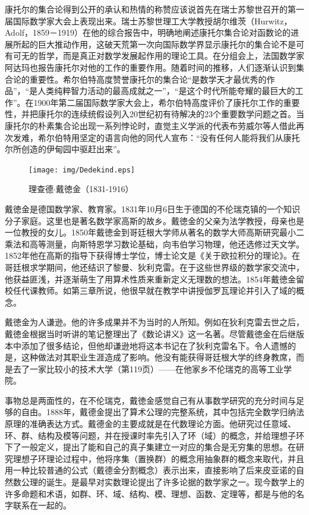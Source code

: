 \documentclass{article}
\begin{document}
康托尔的集合论得到公开的承认和热情的称赞应该说首先在瑞士苏黎世召开的第一届国际数学家大会上表现出来。瑞士苏黎世理工大学教授胡尔维茨（Hurwitz，Adolf，1859－1919）在他的综合报告中，明确地阐述康托尔集合论对函数论的进展所起的巨大推动作用，这破天荒第一次向国际数学界显示康托尔的集合论不是可有可无的哲学，而是真正对数学发展起作用的理论工具。在分组会上，法国数学家阿达玛也报告康托尔对他的工作的重要作用。随着时间的推移，人们逐渐认识到集合论的重要性。希尔伯特高度赞誉康托尔的集合论“是数学天才最优秀的作品”，“是人类纯粹智力活动的最高成就之一”，“是这个时代所能夸耀的最巨大的工作”。在1900年第二届国际数学家大会上，希尔伯特高度评价了康托尔工作的重要性，并把康托尔的连续统假设列入20世纪初有待解决的23个重要数学问题之首。当康托尔的朴素集合论出现一系列悖论时，直觉主义学派的代表布劳威尔等人借此再次发难，希尔伯特用坚定的语言向他的同代人宣布：“没有任何人能将我们从康托尔所创造的伊甸园中驱赶出来”。

\begin{figure}
 \centering
 \texttt{[image: img/Dedekind.eps]}
 \captionsetup{labelformat=empty}
 \caption{理查德$\cdot$戴徳金（1831-1916）}
 \label{fig:Dedekind}
\end{figure}

戴徳金是德国数学家、教育家。1831年10月6日生于德国的不伦瑞克镇的一个知识分子家庭。这里也是著名数学家高斯的故乡。戴徳金的父亲为法学教授，母亲也是一位教授的女儿。1850年戴徳金到哥廷根大学师从著名的数学大师高斯研究最小二乘法和高等测量，向斯特恩学习数论基础，向韦伯学习物理，他还选修过天文学。1852年他在高斯的指导下获得博士学位，博士论文是《关于欧拉积分的理论》。在哥廷根求学期间，他还结识了黎曼、狄利克雷。在于这些世界级的数学家交流中，他获益匪浅，并逐渐萌生了用算术性质来重新定义无理数的想法。1854年戴徳金留校任代课教师。如第三章所说，他很早就在教学中讲授伽罗瓦理论并引入了域的概念。

戴徳金为人谦逊。他的许多成果并不为当时的人所知。例如在狄利克雷去世之后，戴徳金根据当时听讲的笔记整理出了《数论讲义》这一名著。尽管戴徳金在后继版本中添加了很多结论，但他却谦逊地将这本书记在了狄利克雷名下。令人遗憾的是，这种做法对其职业生涯造成了影响。他没有能获得哥廷根大学的终身教席，而是去了一家比较小的技术大学（\cite{Stepanov}第119页）——在他家乡不伦瑞克的高等工业学院。

事物总是两面性的，在不伦瑞克，戴徳金感觉自己有从事数学研究的充分时间与足够的自由。1888年，戴德金提出了算术公理的完整系统，其中包括完全数学归纳法原理的准确表达方式。戴德金的主要成就是在代数理论方面。他研究过任意域、环、群、结构及模等问题，并在授课时率先引入了环（域）的概念，并给理想子环下了一般定义，提出了能和自己的真子集建立一对应的集合是无穷集的思想。在研究理想子环理论过程中，他将序集（置换群）的概念用抽象群的概念来取代，并且用一种比较普通的公式（戴德金分割概念）表示出来，直接影响了后来皮亚诺的自然数公理的诞生。是最早对实数理论提出了许多论据的数学家之一。现今数学上的许多命题和术语，如群、环、域、结构、模、理想、函数、定理等，都是与他的名字联系在一起的。
\end{document}
